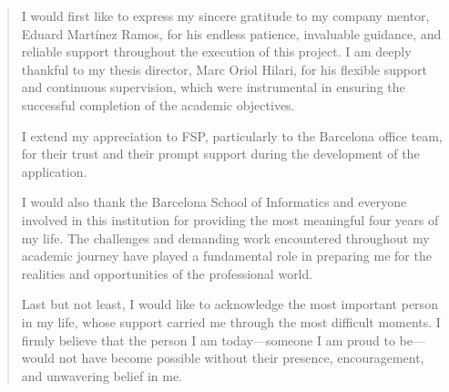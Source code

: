 \renewcommand{\abstractname}{Acknowledgements}

\begin{abstract}

I would first like to express my sincere gratitude to my company mentor, Eduard Martínez Ramos, for his endless patience, invaluable guidance, and reliable support throughout the execution of this project. I am deeply thankful to my thesis director, Marc Oriol Hilari, for his flexible support and continuous supervision, which were instrumental in ensuring the successful completion of the academic objectives.

I extend my appreciation to FSP, particularly to the Barcelona office team, for their trust and their prompt support during the development of the application.

I would also thank the Barcelona School of Informatics and everyone involved in this institution for providing the most meaningful four years of my life. The challenges and demanding work encountered throughout my academic journey have played a fundamental role in preparing me for the realities and opportunities of the professional world.

Last but not least, I would like to acknowledge the most important person in my life, whose support carried me through the most difficult moments. I firmly believe that the person I am today—someone I am proud to be—would not have become possible without their presence, encouragement, and unwavering belief in me.
\end{abstract}

\renewcommand{\abstractname}{Abstract}
